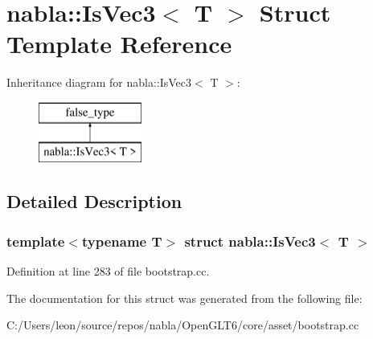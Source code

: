 \hypertarget{structnabla_1_1_is_vec3}{}\section{nabla\+::Is\+Vec3$<$ T $>$ Struct Template Reference}
\label{structnabla_1_1_is_vec3}
Inheritance diagram for nabla\+::Is\+Vec3$<$ T $>$\+:\begin{figure}[H]
\begin{center}
\leavevmode
\includegraphics[height=2.000000cm]{structnabla_1_1_is_vec3}
\end{center}
\end{figure}


\subsection{Detailed Description}
\subsubsection*{template$<$typename T$>$\newline
struct nabla\+::\+Is\+Vec3$<$ T $>$}



Definition at line 283 of file bootstrap.\+cc.



The documentation for this struct was generated from the following file\+:\begin{DoxyCompactItemize}
\item 
C\+:/\+Users/leon/source/repos/nabla/\+Open\+G\+L\+T6/core/asset/bootstrap.\+cc\end{DoxyCompactItemize}
